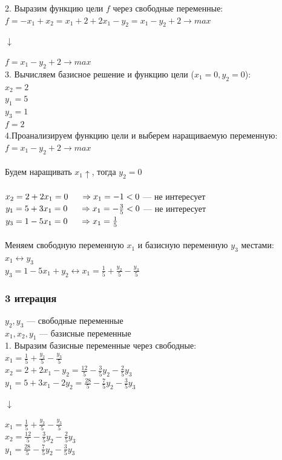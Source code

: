 \documentclass[14pt,a4paper,fleqn]{extarticle}
\begin{document}
2. Выразим функцию цели $f$ через свободные переменные:\\
$f = -x_1 + x_2 = x_1 + 2 + 2x_1 - y_2 = x_1 - y_2 + 2 \longrightarrow max$
\begin{center}$\downarrow$\end{center}
$f = x_1 - y_2 + 2 \longrightarrow max$\\

3. Вычисляем базисное решение и функцию цели ($x_1 = 0, y_2 = 0$):\\
$x_2 = 2$\\
$y_1 = 5$\\
$y_3 = 1$\\
$f = 2$\\

4.Проанализируем функцию цели и выберем наращиваемую переменную:\\
$f = x_1 - y_2 + 2 \longrightarrow max$\\\\
Будем наращивать $x_1 \uparrow$, тогда $y_2 = 0$\\\\
$x_2 = 2 + 2x_1 = 0 \hspace{0.5cm} \Rightarrow x_1 = -1 < 0$ --- не интересует\\
$y_1 = 5 + 3x_1 = 0 \hspace{0.5cm} \Rightarrow x_1 = -\frac{3}{5} < 0$ --- не интересует\\
$y_3 = 1 - 5x_1 = 0 \hspace{0.5cm} \Rightarrow x_1 = \frac{1}{5}$\\\\
Меняем свободную переменную $x_1$ и базисную переменную $y_3$ местами:\\
$x_1 \leftrightarrow y_3$\\
$y_3 = 1 - 5x_1 + y_2 \leftrightarrow x_1 = \frac{1}{5} + \frac{y_2}{5} - \frac{y_3}{5}$

\subsubsection*{3 итерация}
$y_2, y_3$ --- свободные переменные\\
$x_1, x_2, y_1$ --- базисные переменные\\

1. Выразим базисные переменные через свободные:\\
$x_1 = \frac{1}{5} + \frac{y_2}{5} - \frac{y_3}{5}$\\
$x_2 = 2 + 2x_1 - y_2 = \frac{12}{5} - \frac{3}{5}y_2 - \frac{2}{5}y_3$\\
$y_1 = 5 + 3x_1 - 2y_2 = \frac{28}{5} - \frac{7}{5}y_2 - \frac{3}{5}y_3$\\
\begin{center}$\downarrow$\end{center}
$x_1 = \frac{1}{5} + \frac{y_2}{5} - \frac{y_3}{5}$\\
$x_2 = \frac{12}{5} - \frac{3}{5}y_2 - \frac{2}{5}y_3$\\
$y_1 = \frac{28}{5} - \frac{7}{5}y_2 - \frac{3}{5}y_3$\\
\end{document}

